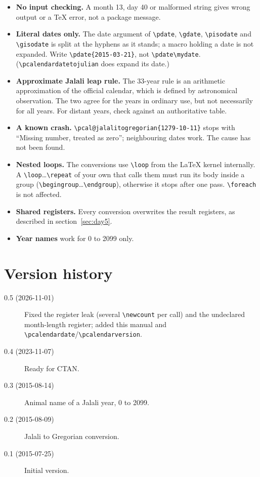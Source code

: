 \documentclass[11pt]{article}
\newcommand\cs[1]{\texttt{\textbackslash #1}}
\begin{document}
\begin{itemize}
  \item \textbf{No input checking.} A month 13, day 40 or malformed string gives wrong output or a TeX
    error, not a package message.
  \item \textbf{Literal dates only.} The date argument of \cs{pdate}, \cs{gdate}, \cs{pisodate} and
    \cs{gisodate} is split at the hyphens as it stands; a macro holding a date is not expanded. Write
    \cs{pdate}\texttt{\{2015-03-21\}}, not \cs{pdate}\cs{mydate}. (\cs{pcalendardatetojulian} does
    expand its date.)
  \item \textbf{Approximate Jalali leap rule.} The 33-year rule is an arithmetic approximation of the
    official calendar, which is defined by astronomical observation. The two agree for the years in
    ordinary use, but not necessarily for all years. For distant years, check against an authoritative
    table.
  \item \textbf{A known crash.} \cs{pcal@jalalitogregorian}\texttt{\{1279-10-11\}} stops with ``Missing
    number, treated as zero''; neighbouring dates work. The cause has not been found.
  \item \textbf{Nested loops.} The conversions use \cs{loop} from the \LaTeX{} kernel internally. A
    \cs{loop}\ldots\cs{repeat} of your own that calls them must run its body inside a group
    (\cs{begingroup}\ldots\cs{endgroup}), otherwise it stops after one pass. \cs{foreach} is not affected.
  \item \textbf{Shared registers.} Every conversion overwrites the result registers, as described in
    section~\ref{sec:day5}.
  \item \textbf{Year names} work for 0 to 2099 only.
\end{itemize}

\section{Version history}\label{sec:version11}

\begin{description}
  \item[0.5 (2026-11-01)] Fixed the register leak (several \cs{newcount} per call) and the undeclared
    month-length register; added this manual and
    \cs{pcalendardate}/\cs{pcalendarversion}.
  \item[0.4 (2023-11-07)] Ready for CTAN.
  \item[0.3 (2015-08-14)] Animal name of a Jalali year, 0 to 2099.
  \item[0.2 (2015-08-09)] Jalali to Gregorian conversion.
  \item[0.1 (2015-07-25)] Initial version.
\end{description}
\end{document}
